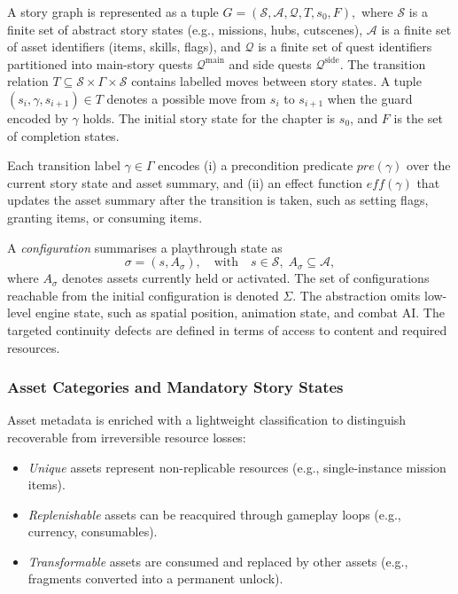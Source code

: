 \documentclass[conference]{IEEEtran}
\newcommand{\States}{\mathcal{S}}
\newcommand{\Assets}{\mathcal{A}}
\newcommand{\Quests}{\mathcal{Q}}
\newcommand{\MainQ}{\mathcal{Q}^{\mathrm{main}}}
\newcommand{\SideQ}{\mathcal{Q}^{\mathrm{side}}}
\begin{document}
A story graph is represented as a tuple
\(
G = (\States, \Assets, \Quests, T, s_0, F),
\)
where $\States$ is a finite set of abstract story states (e.g.,
missions, hubs, cutscenes), $\Assets$ is a finite set of asset
identifiers (items, skills, flags), and $\Quests$ is a finite set of
quest identifiers partitioned into main-story quests $\MainQ$ and side
quests $\SideQ$. The transition relation
$T \subseteq \States \times \Gamma \times \States$ contains labelled
moves between story states. A tuple $(s_i,\gamma,s_{i+1}) \in T$ denotes
a possible move from $s_i$ to $s_{i+1}$ when the guard encoded by
$\gamma$ holds. The initial story state for the chapter is $s_0$, and
$F$ is the set of completion states.

Each transition label $\gamma \in \Gamma$ encodes (i) a precondition
predicate $\mathit{pre}(\gamma)$ over the current story state and asset
summary, and (ii) an effect function $\mathit{eff}(\gamma)$ that updates
the asset summary after the transition is taken, such as setting flags,
granting items, or consuming items.

A \emph{configuration} summarises a playthrough state as
\begin{equation}
\sigma = (s, A_\sigma),
\quad\text{with}\quad
s \in \States,\; A_\sigma \subseteq \Assets,
\end{equation}
where $A_\sigma$ denotes assets currently held or activated. The set of
configurations reachable from the initial configuration is denoted
$\Sigma$. The abstraction omits low-level engine state, such as spatial position,
animation state, and combat AI. The targeted continuity defects are
defined in terms of access to content and required resources.

\subsubsection{Asset Categories and Mandatory Story States}

Asset metadata is enriched with a lightweight classification to
distinguish recoverable from irreversible resource losses:

\begin{itemize}[leftmargin=1.3em]
  \item \emph{Unique} assets represent non-replicable resources (e.g.,
        single-instance mission items).
  \item \emph{Replenishable} assets can be reacquired through gameplay
        loops (e.g., currency, consumables).
  \item \emph{Transformable} assets are consumed and replaced by other
        assets (e.g., fragments converted into a permanent unlock).
\end{itemize}
\end{document}
